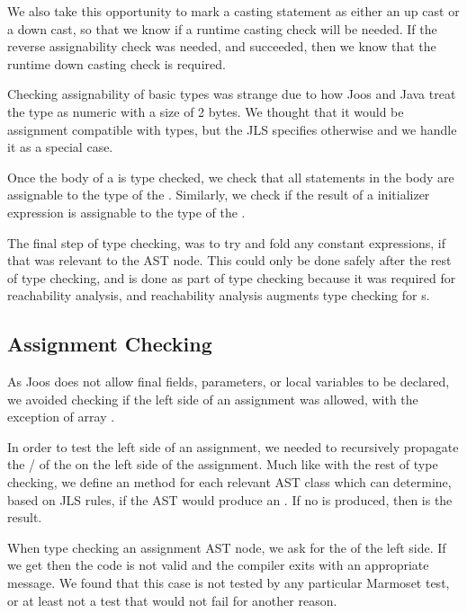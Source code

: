 \documentclass[pdftex,11pt,a4paper]{article}
\begin{document}
We also take this opportunity to mark a casting statement as either an
up cast or a down cast, so that we know if a runtime casting check
will be needed. If the reverse assignability check was needed, and
succeeded, then we know that the runtime down casting check is
required.

Checking assignability of basic types was strange due to how Joos and
Java treat the  type as numeric with a size of 2 bytes. We
thought that it would be assignment compatible with  types,
but the JLS specifies otherwise and we handle it as a special case.

Once the body of a  is type checked, we check that all
 statements in the body are assignable to the type of the
. Similarly, we check if the result of a 
initializer expression is assignable to the type of the .

The final step of type checking, was to try and fold any constant
expressions, if that was relevant to the AST node. This could only be
done safely after the rest of type checking, and is done as part of
type checking because it was required for reachability analysis, and
reachability analysis augments type checking for s.

\subsection{Assignment Checking}

As Joos does not allow final fields, parameters, or local variables to
be declared, we avoided checking if the left side of an assignment was
allowed, with the exception of array .

In order to test the left side of an assignment, we needed to
recursively propagate the / of the
 on the left side of the assignment. Much like with
the rest of type checking, we define an  method for each
relevant AST class which can determine, based on JLS rules, if the AST
would produce an . If no  is produced, then
 is the result.

When type checking an assignment AST node, we ask for the 
of the left side. If we get  then the code is not valid and
the compiler exits with an appropriate message. We found that this
case is not tested by any particular Marmoset test, or at least not a
test that would not fail for another reason.
\end{document}
